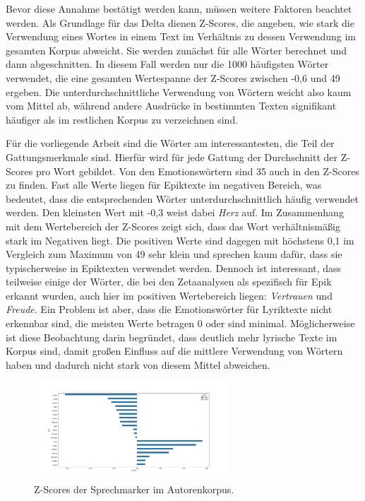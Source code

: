 \documentclass[a4paper,10p]{article}
\begin{document}
Bevor diese Annahme bestätigt werden kann, müssen weitere Faktoren beachtet werden. Als Grundlage für das Delta dienen Z-Scores, die angeben, wie stark die Verwendung eines Wortes in einem Text im Verhältnis zu dessen Verwendung im gesamten Korpus abweicht. Sie werden zunächst für alle Wörter berechnet und dann abgeschnitten. In diesem Fall werden nur die 1000 häufigsten Wörter verwendet, die eine gesamten Wertespanne der Z-Scores zwischen -0,6 und 49 ergeben. Die unterdurchschnittliche Verwendung von Wörtern weicht also kaum vom Mittel ab, während andere Ausdrücke in bestimmten Texten signifikant häufiger als im restlichen Korpus zu verzeichnen sind. \par 

Für die vorliegende Arbeit sind die Wörter am interessantesten, die Teil der Gattungsmerkmale sind. Hierfür wird für jede Gattung der Durchschnitt der Z-Scores pro Wort gebildet. Von den Emotionswörtern sind 35 auch in den Z-Scores zu finden. Fast alle Werte liegen für Epiktexte im negativen Bereich, was bedeutet, dass die entsprechenden Wörter unterdurchschnittlich häufig verwendet werden. Den kleinsten Wert mit -0,3 weist dabei \textit{Herz} auf. Im Zusammenhang mit dem Wertebereich der Z-Scores zeigt sich, dass das Wort verhältnismäßig stark im Negativen liegt. Die positiven Werte sind dagegen mit höchstens 0,1 im Vergleich zum Maximum von 49 sehr klein und sprechen kaum dafür, dass sie typischerweise in Epiktexten verwendet werden. Dennoch ist interessant, dass teilweise einige der Wörter, die bei den Zetaanalysen als spezifisch für Epik erkannt wurden, auch hier im positiven Wertebereich liegen: \textit{Vertrauen} und \textit{Freude}. Ein Problem ist aber, dass die Emotionswörter für Lyriktexte nicht erkennbar sind, die meisten Werte betragen 0 oder sind minimal. Möglicherweise ist diese Beobachtung darin begründet, dass deutlich mehr lyrische Texte im Korpus sind, damit großen Einfluss auf die mittlere Verwendung von Wörtern haben und dadurch nicht stark von diesem Mittel abweichen. \par 

\begin{figure}
	\includegraphics[width=0.65\textwidth]{autoren_sprechmarker_zscores.png}
	\caption{Z-Scores der Sprechmarker im Autorenkorpus.}
	\label{fig:zscore_emo}
\end{figure}
\end{document}
